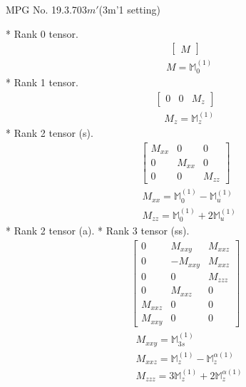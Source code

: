 \documentclass[fleqn,8pt,landscape]{jsarticle}
\begin{document}
\setcounter{MaxMatrixCols}{32}

\renewcommand{\tablename}{Table~}
\renewcommand{\figurename}{Figure~}
\begin{center}
\LARGE
MPG No. 19.3.70\quad$3m'$\quad(3m'1 setting)
\end{center}
* Rank 0 tensor.
\begin{align*}
\begin{bmatrix} M \end{bmatrix}
\end{align*}
\begin{align*}
& M = \mathbb{M}_{0}^{(1)}
\end{align*}
* Rank 1 tensor.
\begin{align*}
\begin{bmatrix} 0 & 0 & M_{z} \end{bmatrix}
\end{align*}
\begin{align*}
& M_{z} = \mathbb{M}_{z}^{(1)}
\end{align*}
* Rank 2 tensor (s).
\begin{align*}
\begin{bmatrix} M_{xx} & 0 & 0 \\ 0 & M_{xx} & 0 \\ 0 & 0 & M_{zz} \end{bmatrix}
\end{align*}
\begin{align*}
& M_{xx} = \mathbb{M}_{0}^{(1)} - \mathbb{M}_{u}^{(1)} \\
& M_{zz} = \mathbb{M}_{0}^{(1)} + 2 \mathbb{M}_{u}^{(1)}
\end{align*}
* Rank 2 tensor (a).
* Rank 3 tensor (ss).
\begin{align*}
\begin{bmatrix} 0 & M_{xxy} & M_{xxz} \\ 0 & - M_{xxy} & M_{xxz} \\ 0 & 0 & M_{zzz} \\ 0 & M_{xxz} & 0 \\ M_{xxz} & 0 & 0 \\ M_{xxy} & 0 & 0 \end{bmatrix}
\end{align*}
\begin{align*}
& M_{xxy} = \mathbb{M}_{3s}^{(1)} \\
& M_{xxz} = \mathbb{M}_{z}^{(1)} - \mathbb{M}_{z}^{\alpha(1)} \\
& M_{zzz} = 3 \mathbb{M}_{z}^{(1)} + 2 \mathbb{M}_{z}^{\alpha(1)}
\end{align*}
\end{document}
